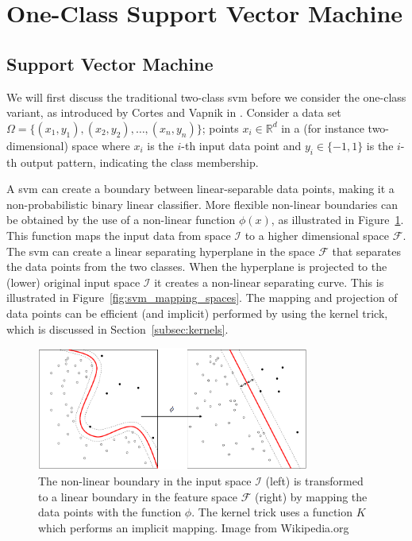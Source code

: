 \section{One-Class Support Vector Machine}\label{sec:one_class_svm}


\subsection{Support Vector Machine}\label{subsec:svm}
We will first discuss the traditional two-class \gls{svm} before we consider the one-class variant, as introduced by Cortes and Vapnik in \cite{cortes1995support}.
Consider a data set $\Omega = \{ (x_1, y_1),\allowbreak (x_2, y_2), \dots , (x_n, y_n) \}$; points $x_i \in \mathbb{R}^d$ in a (for instance two-dimensional) space where $x_i$ is the $i$-th input data point and $y_i \in \{-1, 1\}$ is the $i$-th output pattern, indicating the class membership.

A \gls{svm} can create a boundary between linear-separable data points, making it a non-probabilistic binary linear classifier.
More flexible non-linear boundaries can be obtained by the use of a non-linear function $\phi(x)$, as illustrated in Figure~\ref{fig:kernel_mapping}.
This function maps the input data from space $\mathcal{I}$ to a higher dimensional space $\mathcal{F}$.
The \gls{svm} can create a linear separating hyperplane in the space $\mathcal{F}$ that separates the data points from the two classes.
When the hyperplane is projected to the (lower) original input space $\mathcal{I}$ it creates a non-linear separating curve.
This is illustrated in Figure~\ref{fig:svm_mapping_spaces}.
The mapping and projection of data points can be efficient (and implicit) performed by using the kernel trick, which is discussed in Section~\ref{subsec:kernels}.

\begin{figure}
\centering
  \includegraphics[width=0.8\textwidth]{./Figures/chapter3/svm_kernel_mapping.png}
  \caption[Kernel mapping]{The non-linear boundary in the input space $\mathcal{I}$ (left) is transformed to a linear boundary in the feature space $\mathcal{F}$ (right) by mapping the data points with the function $\phi$. The kernel trick uses a function $K$ which performs an implicit mapping. Image from Wikipedia.org\footnotemark}
  \label{fig:kernel_mapping}
\end{figure}

